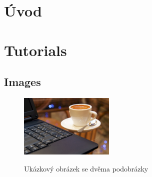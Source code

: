 \documentclass[czech,master,dept460,male,cpp,cpdeclaration]{diploma}
\begin{document}
\MakeTitlePages
\section{Úvod}
\section{Tutorials}

\subsection{Images}

\begin{figure}
  \centering
  \includegraphics[width=0.4\textwidth]{Figures/CoffeeAndComputer.jpg}
\end{figure}

\begin{figure}
  \centering
  \hspace{3em} %
  \caption{Ukázkový obrázek se dvěma podobrázky}
  \label{fig:TopLevelFigureLabel}
\end{figure}
\end{document}
